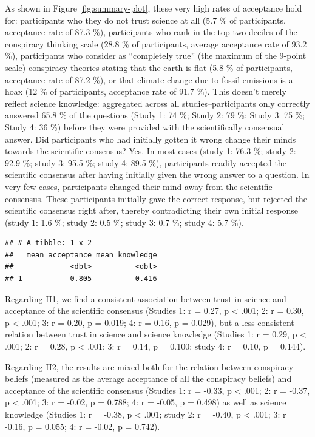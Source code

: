\documentclass[
  doc,floatsintext]{apa6}
\begin{document}
As shown in Figure \ref{fig:summary-plot}, these very high rates of acceptance hold for: participants who they do not trust science at all (5.7 \% of participants, acceptance rate of 87.3 \%), participants who rank in the top two deciles of the conspiracy thinking scale (28.8 \% of participants, average acceptance rate of 93.2 \%), participants who consider as ``completely true'' (the maximum of the 9-point scale) conspiracy theories stating that the earth is flat (5.8 \% of participants, acceptance rate of 87.2 \%), or that climate change due to fossil emissions is a hoax (12 \% of participants, acceptance rate of 91.7 \%). This doesn't merely reflect science knowledge: aggregated across all studies--participants only correctly answered 65.8 \% of the questions (Study 1: 74 \%; Study 2: 79 \%; Study 3: 75 \%; Study 4: 36 \%) before they were provided with the scientifically consensual answer. Did participants who had initially gotten it wrong change their minds towards the scientific consensus? Yes. In most cases (study 1: 76.3 \%; study 2: 92.9 \%; study 3: 95.5 \%; study 4: 89.5 \%), participants readily accepted the scientific consensus after having initially given the wrong answer to a question. In very few cases, participants changed their mind away from the scientific consensus. These participants initially gave the correct response, but rejected the scientific consensus right after, thereby contradicting their own initial response (study 1: 1.6 \%; study 2: 0.5 \%; study 3: 0.7 \%; study 4: 5.7 \%).

\begin{verbatim}
## # A tibble: 1 x 2
##   mean_acceptance mean_knowledge
##             <dbl>          <dbl>
## 1           0.805          0.416
\end{verbatim}

Regarding H1, we find a consistent association between trust in science and acceptance of the scientific consensus (Studies 1: r = 0.27, p \textless{} .001; 2: r = 0.30, p \textless{} .001; 3: r = 0.20, p = 0.019; 4: r = 0.16, p = 0.029), but a less consistent relation between trust in science and science knowledge (Studies 1: r = 0.29, p \textless{} .001; 2: r = 0.28, p \textless{} .001; 3: r = 0.14, p = 0.100; study 4: r = 0.10, p = 0.144).

Regarding H2, the results are mixed both for the relation between conspiracy beliefs (measured as the average acceptance of all the conspiracy beliefs) and acceptance of the scientific consensus (Studies 1: r = -0.33, p \textless{} .001; 2: r = -0.37, p \textless{} .001; 3: r = -0.02, p = 0.788; 4: r = -0.05, p = 0.498) as well as science knowledge (Studies 1: r = -0.38, p \textless{} .001; study 2: r = -0.40, p \textless{} .001; 3: r = -0.16, p = 0.055; 4: r = -0.02, p = 0.742).
\end{document}
